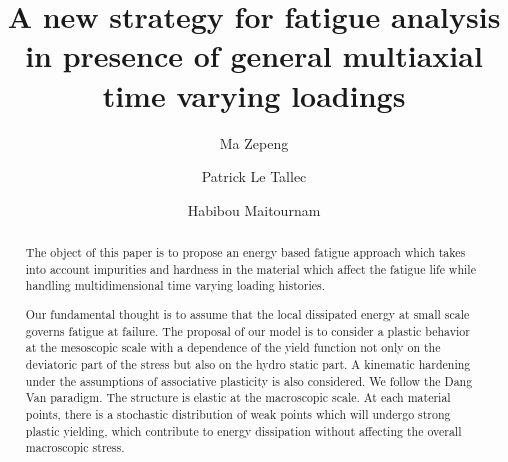 \documentclass[3p,times,procedia,number]{elsarticle}
\begin{document}
\begin{frontmatter}



\title{A new strategy for fatigue analysis in presence of general multiaxial time varying loadings}




\author[a]{Ma Zepeng}
\author[b]{Patrick Le Tallec}
\author[c]{Habibou Maitournam}

\address[a]{Laboratory of Solid Mechanics, Ecole Polytechnique, 91128 Palaiseau Cedex, France}
\address[b]{Laboratory of Solid Mechanics, Ecole Polytechnique, 91128 Palaiseau Cedex, France}
\address[c]{IMSIA, ENSTA ParisTech, CNRS, CEA, EDF, Université Paris-Saclay, 828 bd des Maréchaux, 91762 Palaiseau cedex France}

\begin{abstract}
The object of this paper is to propose an energy based fatigue approach which takes into account impurities and hardness in the material which affect the fatigue life while handling multidimensional time varying loading histories.

Our fundamental thought is to assume that the local dissipated energy at small scale governs fatigue at failure. The proposal of our model is to consider a plastic behavior at the mesoscopic scale with a dependence of the yield function not only on the deviatoric part of the stress but also on the hydro static part. A kinematic hardening under the assumptions of associative plasticity is also considered. We follow the Dang Van paradigm. The structure is elastic at the macroscopic scale. At each material points, there is a stochastic distribution of weak points which will undergo strong plastic yielding, which contribute to energy dissipation without affecting the overall macroscopic stress.


\end{abstract}
\end{frontmatter}
\end{document}
